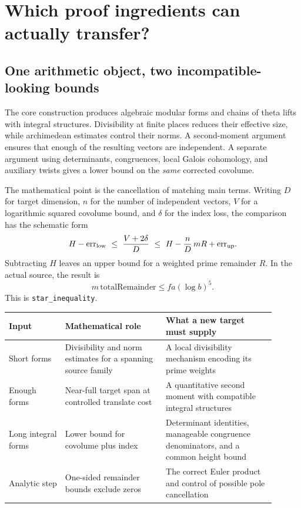 \section{Which proof ingredients can actually transfer?}
\label{sec:architecture}

\subsection{One arithmetic object, two incompatible-looking bounds}

The core construction produces algebraic modular forms and chains of
theta lifts with integral structures. Divisibility at finite places
reduces their effective size, while archimedean estimates control their
norms. A second-moment argument ensures that enough of the resulting
vectors are independent. A separate argument using determinants,
congruences, local Galois cohomology, and auxiliary twists gives a
lower bound on the \emph{same} corrected covolume.

The mathematical point is the cancellation of matching main terms.
Writing \(D\) for target dimension, \(n\) for the number of independent
vectors, \(V\) for a logarithmic squared covolume bound, and \(\delta\)
for the index loss, the comparison has the schematic form
\[
 H-\mathrm{err}_{\rm low}
 \ \leq\ \frac{V+2\delta}{D}
 \ \leq\ H-\frac nD\,mR+\mathrm{err}_{\rm up}.
\]
Subtracting \(H\) leaves an upper bound for a weighted prime remainder
\(R\). In the actual source, the result is
\begin{equation}
\label{eq:star}
 m\,\mathrm{totalRemainder}\leq f a(\log b)^5.
\end{equation}
This is \texttt{star\_inequality}.\cite{mainineq}

\begin{center}
\small
\begin{tabular}{p{0.19\linewidth}p{0.34\linewidth}p{0.37\linewidth}}
\toprule
Input & Mathematical role & What a new target must supply\\
\midrule
Short forms & Divisibility and norm estimates for a spanning source
family & A local divisibility mechanism encoding its prime weights\\[3pt]
Enough forms & Near-full target span at controlled translate cost
& A quantitative second moment with compatible integral structures\\[3pt]
Long integral forms & Lower bound for covolume plus index
& Determinant identities, manageable congruence denominators,
and a common height bound\\[3pt]
Analytic step & One-sided remainder bounds exclude zeros
& The correct Euler product and control of possible pole cancellation\\
\bottomrule
\end{tabular}
\end{center}

